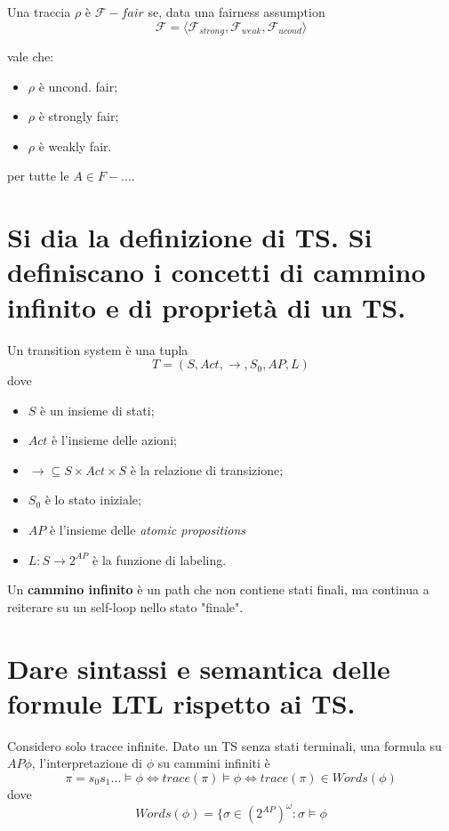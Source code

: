 \documentclass[a4paper,11pt]{article}
\begin{document}
	Una traccia $\rho$ è $\mathcal{F}-fair$ se, data una fairness assumption \[ \mathcal{F} =\langle \mathcal{F}_{strong}, \mathcal{F}_{weak}, \mathcal{F}_{ucond} \rangle \]

	vale che: \begin{itemize}
		\item $\rho$ è uncond. fair;
		\item $\rho$ è strongly fair;
		\item $\rho$ è  weakly fair.
	\end{itemize}

	per tutte le $A \in F-\dots$.

	\section{Si dia la definizione di TS. Si definiscano i concetti di cammino infinito e di proprietà di un TS.}

	Un transition system è una tupla \[ T = (S, Act, \rightarrow, S_0, AP, L) \]
	dove \begin{itemize}
		\item $S$ è un insieme di stati;
		\item $Act$ è l'insieme delle azioni;
		\item $\rightarrow \subseteq S \times Act \times S$ è la relazione di transizione;
		\item $S_0$ è lo stato iniziale;
		\item $AP$ è l'insieme delle \textit{atomic propositions}
		\item $L:S \to 2^{AP}$ è la funzione di labeling.
	\end{itemize}

	Un \textbf{cammino infinito} è un path che non contiene stati finali, ma continua a reiterare su un self-loop nello stato "finale".

	\section{Dare sintassi e semantica delle formule LTL rispetto ai TS.}
	Considero solo tracce infinite. Dato un TS senza stati terminali, una formula su $AP \phi$, l'interpretazione di $\phi$ su cammini infiniti è \[ \pi = s_0s_1 \dots \models \phi \iff trace(\pi) \models \phi \iff trace(\pi) \in Words(\phi) \]
	dove \[ Words(\phi) = \lbrace \sigma \in (2^{AP})^\omega : \sigma \models \phi \]	
\end{document}
